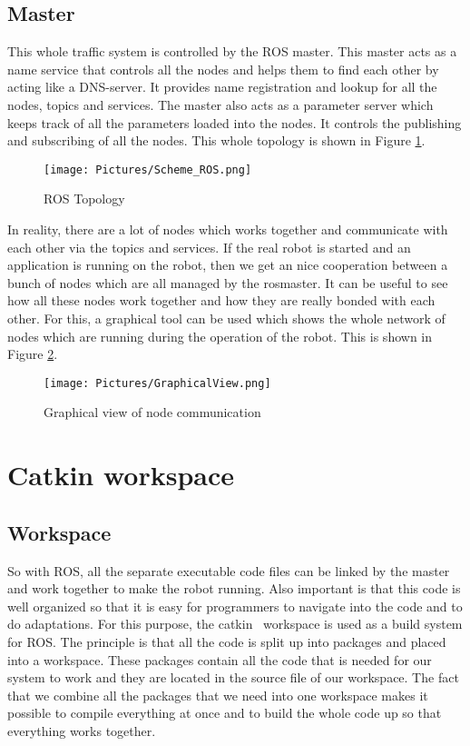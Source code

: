 \documentclass[11pt,a4paper]{report}
\begin{document}
\subsection{Master}
This whole traffic system is controlled by the ROS master. This master acts as a name service that controls all the nodes and helps them to find each other by acting like a DNS-server. It provides name registration and lookup for all the nodes, topics and services. The master also acts as a parameter server which keeps track of all the parameters loaded into the nodes. It controls the publishing and subscribing of all the nodes. This whole topology is shown in Figure \ref{fig:ROSTopology}.

\begin{figure}[!ht]
	\centering
	\texttt{[image: Pictures/Scheme\_ROS.png]}
	\caption{ROS Topology}
	\label{fig:ROSTopology}
\end{figure}

In reality, there are a lot of nodes which works together and communicate with each other via the topics and services. If the real robot is started and an application is running on the robot, then we get an nice cooperation between a bunch of nodes which are all managed by the rosmaster. It can be useful to see how all these nodes work together and how they are really bonded with each other. For this, a graphical tool can be used which shows the whole network of nodes which are running during the operation of the robot. This is shown in Figure \ref{fig:GraphicalView}.

\begin{figure}[!ht]
	\centering
		\texttt{[image: Pictures/GraphicalView.png]}
		\caption{Graphical view of node communication}
	\label{fig:GraphicalView}
\end{figure}

\section{Catkin workspace}
\subsection{Workspace}
So with ROS, all the separate executable code files can be linked by the master and work together to make the robot running. Also important is that this code is well organized so that it is easy for programmers to navigate into the code and to do adaptations. For this purpose, the catkin~\cite{Catkin} workspace is used as a build system for ROS. The principle is that all the code is split up into packages and placed into a workspace. These packages contain all the code that is needed for our system to work and they are located in the source file of our workspace. The fact that we combine all the packages that we need into one workspace makes it possible to compile everything at once and to build the whole code up so that everything works together.
\end{document}
